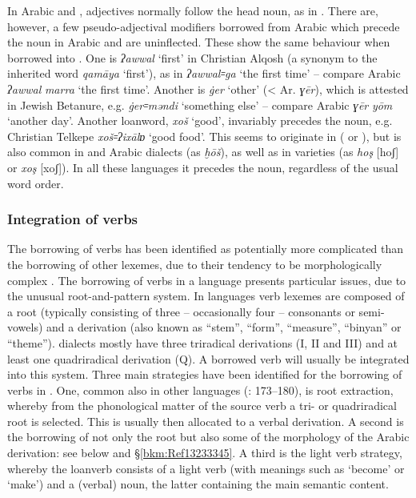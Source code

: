 \documentclass[output=paper]{langsci/langscibook}
\begin{document}
In Arabic and , adjectives normally follow the head noun, as in . There are, however, a few pseudo-adjectival modifiers borrowed from Arabic which precede the noun in Arabic and are uninflected. These show the same behaviour when borrowed into . One is \textit{ʔawwal} ‘first’ in Christian Alqosh (a synonym to the inherited word \textit{qamāya} ‘first’), as in \textit{ʔawwal꞊ga} ‘the first time’ – compare Arabic \textit{ʔawwal} \textit{marra} ‘the first time’. Another is \textit{\.ger} ‘other’ (<  Ar. \textit{ɣēr}), which is attested in Jewish Betanure, e.g. \textit{\.ger꞊məndi} ‘something else’ \citep[105]{Mutzafi2008} – compare  Arabic \textit{ɣēr} \textit{yōm} ‘another day’. Another {loanword}, \textit{xoš} ‘good’, invariably precedes the noun, e.g. Christian Telkepe \textit{xoš꞊ʔixālɒ} ‘good food’. This seems to originate in  ( or ), but is also common in  and  Arabic dialects (as \textit{ḫōš}), as well as in  varieties (as \textit{hoş} [hoʃ] or \textit{xoş} [xoʃ]). In all these languages it precedes the noun, regardless of the usual {word order}.

\subsubsection{\label{bkm:Ref13233110}Integration of verbs}

The borrowing of verbs has been identified as potentially more complicated than the borrowing of other lexemes, due to their tendency to be morphologically complex \citep[175]{Matras2009}. The borrowing of verbs in a  language presents particular issues, due to the unusual {root-and-pattern} system. In  languages verb lexemes are composed of a {root} (typically consisting of three – occasionally four – consonants or semi-vowels) and a {derivation} (also known as ``{stem}'', ``form'', ``measure'', ``binyan'' or ``theme'').  dialects mostly have three triradical derivations (I, II and III) and at least one quadriradical {derivation} (Q). A borrowed verb will usually be integrated into this system. Three main strategies have been identified for the borrowing of verbs in . One, common also in other  languages (\citealt{Wohlgemuth2009}: 173–180), is {root} extraction, whereby from the phonological matter of the source verb a tri- or quadriradical {root} is selected. This is usually then allocated to a verbal {derivation}. A second is the borrowing of not only the {root} but also some of the morphology of the Arabic {derivation}: see below and §\ref{bkm:Ref13233345}. A third is the {light verb} strategy, whereby the loanverb consists of a {light verb} (with meanings such as `become' or `make') and a (verbal) noun, the latter containing the main semantic content. 
\end{document}
